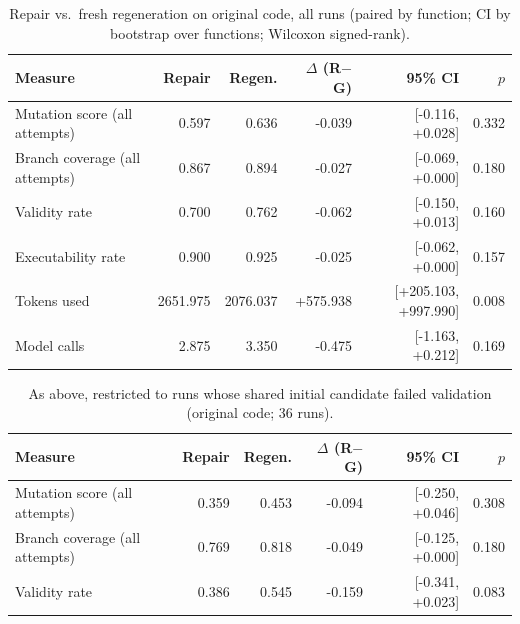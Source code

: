 \begin{table}[t]
\centering\small
\caption{Repair vs.\ fresh regeneration on original code, all runs (paired by function; CI by bootstrap over functions; Wilcoxon signed-rank).}
\label{tab:main-original}
\begin{tabular}{lrrrrr}
\toprule
Measure & Repair & Regen. & $\Delta$ (R$-$G) & 95\% CI & $p$ \\
\midrule
Mutation score (all attempts) & 0.597 & 0.636 & -0.039 & [-0.116, +0.028] & 0.332 \\
Branch coverage (all attempts) & 0.867 & 0.894 & -0.027 & [-0.069, +0.000] & 0.180 \\
Validity rate & 0.700 & 0.762 & -0.062 & [-0.150, +0.013] & 0.160 \\
Executability rate & 0.900 & 0.925 & -0.025 & [-0.062, +0.000] & 0.157 \\
Tokens used & 2651.975 & 2076.037 & +575.938 & [+205.103, +997.990] & 0.008 \\
Model calls & 2.875 & 3.350 & -0.475 & [-1.163, +0.212] & 0.169 \\
\bottomrule
\end{tabular}
\end{table}

\begin{table}[t]
\centering\small
\caption{As above, restricted to runs whose shared initial candidate failed validation (original code; 36 runs).}
\label{tab:fail-original}
\begin{tabular}{lrrrrr}
\toprule
Measure & Repair & Regen. & $\Delta$ (R$-$G) & 95\% CI & $p$ \\
\midrule
Mutation score (all attempts) & 0.359 & 0.453 & -0.094 & [-0.250, +0.046] & 0.308 \\
Branch coverage (all attempts) & 0.769 & 0.818 & -0.049 & [-0.125, +0.000] & 0.180 \\
Validity rate & 0.386 & 0.545 & -0.159 & [-0.341, +0.023] & 0.083 \\
\bottomrule
\end{tabular}
\end{table}

